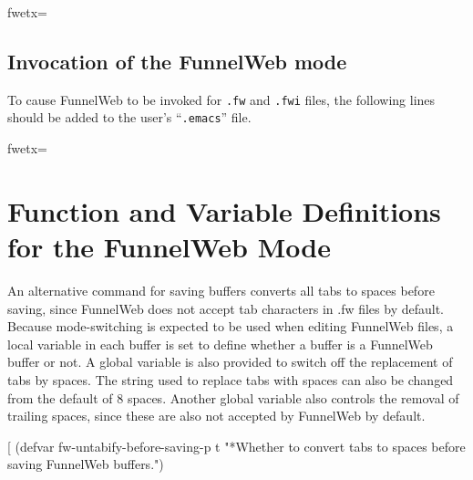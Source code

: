 {\fwbeginmacro
{}\fwplusequals \fwodef {}fwetx=%
\fwcdef 
\fwbeginmacronotes
{}
\fwendmacronotes
\fwendmacro


\section{Invocation of the FunnelWeb mode}
To cause FunnelWeb to be invoked for {\tt .fw} and {\tt .fwi} files,
the following lines should be added to the user's ``{\tt .emacs}''
file.

\fwbeginmacro
{}\fwzero{}\fwequals \fwodef {}fwetx=%
\fwcdef 
\fwbeginmacronotes
{}
\fwendmacronotes
\fwendmacro


\chapter{Function and Variable Definitions for the FunnelWeb Mode}
An alternative command for saving buffers converts all tabs to spaces
before saving, since FunnelWeb does not accept tab characters in .fw
files by default.  Because mode-switching is expected to be used when
editing FunnelWeb files, a local variable in each buffer is set to
define whether a buffer is a FunnelWeb buffer or not.  A global
variable is also provided to switch off the replacement of tabs by
spaces.  The string used to replace tabs with spaces can also be
changed from the default of 8 spaces.  Another global variable also
controls the removal of trailing spaces, since these are also not
accepted by FunnelWeb by default.

\fwbeginmacro
{}\fwplusequals \fwodef \fwbtx[
(defvar fw-untabify-before-saving-p t
  "*Whether to convert tabs to spaces before saving FunnelWeb
buffers.")

}

